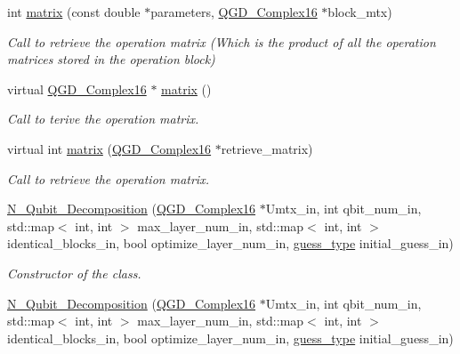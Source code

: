 \begin{DoxyCompactItemize}
int \hyperlink{class_operation__block_abf4287a38eeca35a81163f86a361d95c}{matrix} (const double $\ast$parameters, \hyperlink{struct_q_g_d___complex16}{Q\+G\+D\+\_\+\+Complex16} $\ast$block\+\_\+mtx)
\begin{DoxyCompactList}\small\item\em Call to retrieve the operation matrix (Which is the product of all the operation matrices stored in the operation block) \end{DoxyCompactList}\item 
virtual \hyperlink{struct_q_g_d___complex16}{Q\+G\+D\+\_\+\+Complex16} $\ast$ \hyperlink{class_operation_acf7d1765143285ff73772ae860109988}{matrix} ()
\begin{DoxyCompactList}\small\item\em Call to terive the operation matrix. \end{DoxyCompactList}\item 
virtual int \hyperlink{class_operation_add11c6ea2626d8dbcbd00f328a8a8279}{matrix} (\hyperlink{struct_q_g_d___complex16}{Q\+G\+D\+\_\+\+Complex16} $\ast$retrieve\+\_\+matrix)
\begin{DoxyCompactList}\small\item\em Call to retrieve the operation matrix. \end{DoxyCompactList}\item 
\hyperlink{class_n___qubit___decomposition_a37d8f49ff9178f55a622528d9cbcdbc5}{N\+\_\+\+Qubit\+\_\+\+Decomposition} (\hyperlink{struct_q_g_d___complex16}{Q\+G\+D\+\_\+\+Complex16} $\ast$Umtx\+\_\+in, int qbit\+\_\+num\+\_\+in, std\+::map$<$ int, int $>$ max\+\_\+layer\+\_\+num\+\_\+in, std\+::map$<$ int, int $>$ identical\+\_\+blocks\+\_\+in, bool optimize\+\_\+layer\+\_\+num\+\_\+in, \hyperlink{decomposition_2include_2_decomposition___base_8h_a0e76cf2e4eb5edbf067ba5014ffa2134}{guess\+\_\+type} initial\+\_\+guess\+\_\+in)
\begin{DoxyCompactList}\small\item\em Constructor of the class. \end{DoxyCompactList}\item 
\hyperlink{class_n___qubit___decomposition_a37d8f49ff9178f55a622528d9cbcdbc5}{N\+\_\+\+Qubit\+\_\+\+Decomposition} (\hyperlink{struct_q_g_d___complex16}{Q\+G\+D\+\_\+\+Complex16} $\ast$Umtx\+\_\+in, int qbit\+\_\+num\+\_\+in, std\+::map$<$ int, int $>$ max\+\_\+layer\+\_\+num\+\_\+in, std\+::map$<$ int, int $>$ identical\+\_\+blocks\+\_\+in, bool optimize\+\_\+layer\+\_\+num\+\_\+in, \hyperlink{decomposition_2include_2_decomposition___base_8h_a0e76cf2e4eb5edbf067ba5014ffa2134}{guess\+\_\+type} initial\+\_\+guess\+\_\+in)

\end{DoxyCompactItemize}

